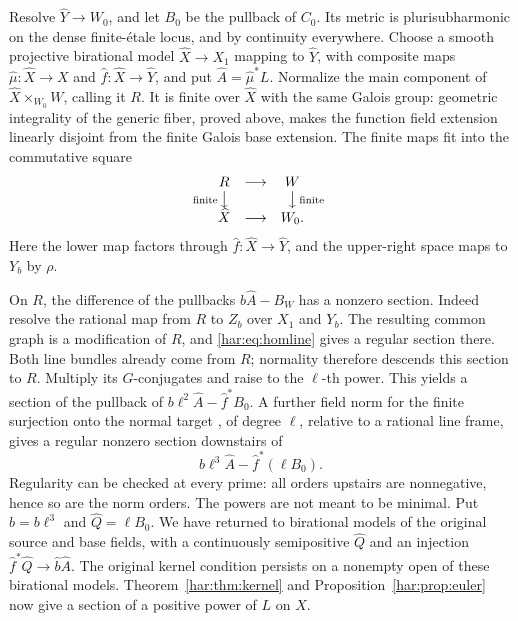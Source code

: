 Resolve \(\widehat Y\to W_0\), and let \(B_0\) be the pullback of
\(C_0\). Its metric is plurisubharmonic on the dense finite-étale
locus, and by continuity everywhere. Choose a smooth projective
birational model \(\widehat X\to X_1\) mapping to \(\widehat Y\),
with composite maps $\widehat\mu:\widehat X\to X$ and $\widehat f:\widehat X\to\widehat Y$, and put \(\widehat A=\widehat\mu^*L\). Normalize the main component of
\(\widehat X\times_{W_0}W\), calling it \(R\). It is finite over
\(\widehat X\) with the same Galois group: geometric integrality of
the generic fiber, proved above, makes the function field extension
linearly disjoint from the finite Galois base extension.
The finite maps fit into the commutative square
\[
\begin{array}{ccc}
 R & \longrightarrow & W\\
 \mathllap{\scriptstyle\mathrm{finite}\,}\big\downarrow &&
       \big\downarrow\mathrlap{\,\scriptstyle\mathrm{finite}}\\
 \widehat X & \longrightarrow & W_0 .
\end{array}
\]
Here the lower map factors through \(\widehat f:\widehat X\to
\widehat Y\), and the upper-right space maps to \(Y_b\) by \(\rho\).

On \(R\), the difference of the pullbacks \(b\widehat A-B_W\) has
a nonzero section. Indeed resolve the rational map from \(R\) to
\(Z_b\) over \(X_1\) and \(Y_b\). The resulting common graph is a
modification of \(R\), and \eqref{har:eq:homline} gives a regular
section there. Both line bundles already come from \(R\); normality
therefore descends this section to \(R\). Multiply its \(G\)-conjugates and
raise to the \(\ell\)-th power. This yields a section of the
pullback of \(b\ell^2\widehat A-\widehat f^*B_0\). A further field
norm for the finite surjection onto the normal target
\cite[Lemma~31.18.7]{StacksNormNormal}, of degree \(\ell\), relative to a rational line frame, gives
a regular nonzero section downstairs of
\begin{equation}\label{har:eq:descendedalteration}
 b\ell^3\widehat A-\widehat f^*(\ell B_0).
\end{equation}
Regularity can be checked at every prime: all orders upstairs are
nonnegative, hence so are the norm orders. The powers are not meant
to be minimal. Put \(\widehat b=b\ell^3\) and
\(\widehat Q=\ell B_0\). We have returned to birational models of
the original source and base fields, with a continuously semipositive
\(\widehat Q\) and an injection
\(\widehat f^*\widehat Q\to\widehat b\widehat A\).
The original kernel condition persists on a nonempty open of these
birational models. Theorem~\ref{har:thm:kernel} and
Proposition~\ref{har:prop:euler} now give a section of a positive
power of \(L\) on \(X\).
